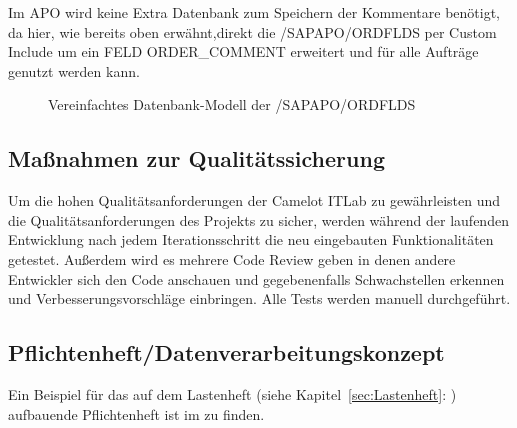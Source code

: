 Im \ac{APO} wird keine Extra Datenbank zum Speichern der Kommentare benötigt, da hier, wie bereits oben erwähnt,direkt die /SAPAPO/ORDFLDS per Custom Include um ein FELD ORDER\_COMMENT erweitert und für alle Aufträge genutzt werden kann.  

\begin{figure}[htb]
	\centering
	\caption{Vereinfachtes Datenbank-Modell der /SAPAPO/ORDFLDS}
	\label{fig:APO01}
\end{figure} 

\subsection{Maßnahmen zur Qualitätssicherung}
\label{sec:Qualitaetssicherung}
Um die hohen Qualitätsanforderungen der Camelot ITLab zu gewährleisten und die Qualitätsanforderungen des Projekts zu sicher, werden während der laufenden Entwicklung nach jedem Iterationsschritt die neu eingebauten Funktionalitäten getestet. Außerdem wird es mehrere Code Review geben in denen andere Entwickler sich den Code anschauen und gegebenenfalls Schwachstellen erkennen und Verbesserungsvorschläge einbringen. Alle Tests werden manuell durchgeführt.  

\subsection{Pflichtenheft/Datenverarbeitungskonzept}
\label{sec:Pflichtenheft}
Ein Beispiel für das auf dem Lastenheft (siehe Kapitel~\ref{sec:Lastenheft}: ) aufbauende Pflichtenheft ist im  zu finden.

